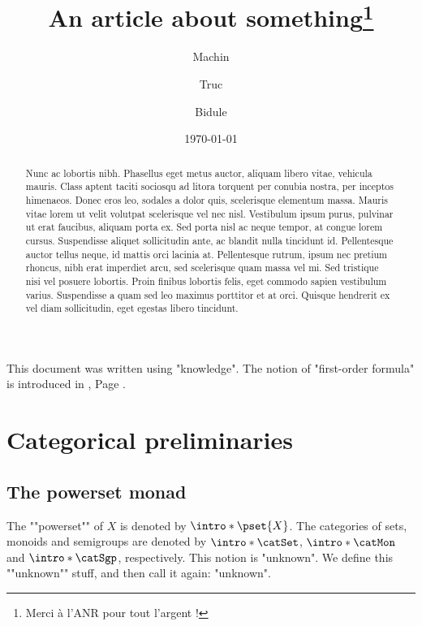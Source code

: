 \documentclass{fancy-article}
\title{An article about something\thanks{Merci à l'ANR pour tout l'argent !}}
\author[1]{Machin}
\author[2]{Truc}
\author[1]{Bidule}
\affil[1]{Institut du Fromage}
\affil[2]{Baguette Université Sorbonne-Est}
\date{\today}
\begin{document}
\maketitle

\begin{abstract}
  Nunc ac lobortis nibh. Phasellus eget metus auctor, aliquam libero vitae, vehicula mauris. Class aptent taciti sociosqu ad litora torquent per conubia nostra, per inceptos himenaeos. Donec eros leo, sodales a dolor quis, scelerisque elementum massa. Mauris vitae lorem ut velit volutpat scelerisque vel nec nisl. Vestibulum ipsum purus, pulvinar ut erat faucibus, aliquam porta ex. Sed porta nisl ac neque tempor, at congue lorem cursus. Suspendisse aliquet sollicitudin ante, ac blandit nulla tincidunt id. Pellentesque auctor tellus neque, id mattis orci lacinia at. Pellentesque rutrum, ipsum nec pretium rhoncus, nibh erat imperdiet arcu, sed scelerisque quam massa vel mi. Sed tristique nisi vel posuere lobortis. Proin finibus lobortis felis, eget commodo sapien vestibulum varius. Suspendisse a quam sed leo maximus porttitor et at orci. Quisque hendrerit ex vel diam sollicitudin, eget egestas libero tincidunt. 
\end{abstract}

This document was written using "knowledge".
The notion of "first-order formula" is introduced in
, Page .

\section{Categorical preliminaries}
 
\subsection{The powerset monad}

\AP The ""powerset"" of $X$ is denoted by $\intro*\pset{X}$. The categories
of sets, monoids and semigroups are denoted by $\intro*\catSet$,
$\intro*\catMon$ and $\intro*\catSgp$, respectively.
This notion is "unknown". We define this ""unknown"" stuff, and then call it again: "unknown".
\end{document}
